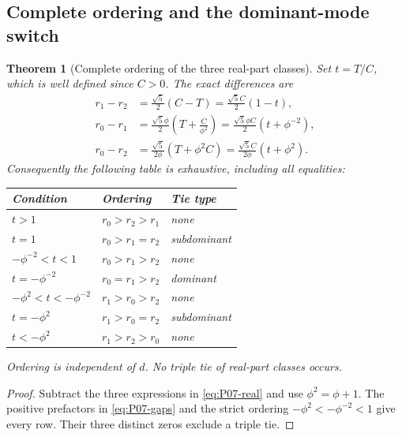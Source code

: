 \documentclass[11pt]{article}
\newtheorem{theorem}{Theorem}[section]
\theoremstyle{definition}
\theoremstyle{remark}
\begin{document}
\subsection{Complete ordering and the dominant-mode switch}
\label{slot:P07-2}
\begin{theorem}[Complete ordering of the three real-part classes]
\label{thm:P07-ordering}
Set $t=T/C$, which is well defined since $C>0$. The exact differences are
\begin{align}
 r_1-r_2&=\frac{\sqrt5}{2}(C-T)
              =\frac{\sqrt5 C}{2}(1-t),\label{eq:P07-gaps}\\
 r_0-r_1&=\frac{\sqrt5\phi}{2}
                    \left(T+\frac{C}{\phi^2}\right)
              =\frac{\sqrt5\phi C}{2}(t+\phi^{-2}),\nonumber\\
 r_0-r_2&=\frac{\sqrt5}{2\phi}(T+\phi^2 C)
              =\frac{\sqrt5 C}{2\phi}(t+\phi^2).\nonumber
\end{align}
Consequently the following table is exhaustive, including all equalities:
\begin{center}
\renewcommand{\arraystretch}{1.15}
\begin{tabular}{@{}l l l@{}}
\toprule
Condition&Ordering&Tie type\\
\midrule
$t>1$&$r_0>r_2>r_1$&none\\
$t=1$&$r_0>r_1=r_2$&subdominant\\
$-\phi^{-2}<t<1$&$r_0>r_1>r_2$&none\\
$t=-\phi^{-2}$&$r_0=r_1>r_2$&dominant\\
$-\phi^2<t<-\phi^{-2}$&$r_1>r_0>r_2$&none\\
$t=-\phi^2$&$r_1>r_0=r_2$&subdominant\\
$t<-\phi^2$&$r_1>r_2>r_0$&none\\
\bottomrule
\end{tabular}
\end{center}
Ordering is independent of $d$. No triple tie of real-part classes occurs.
\end{theorem}
\begin{proof}
Subtract the three expressions in \eqref{eq:P07-real} and use
$\phi^2=\phi+1$. The positive prefactors in \eqref{eq:P07-gaps}
and the strict ordering $-\phi^2<-\phi^{-2}<1$ give every row.
Their three distinct zeros exclude a triple tie.
\end{proof}
\end{document}
